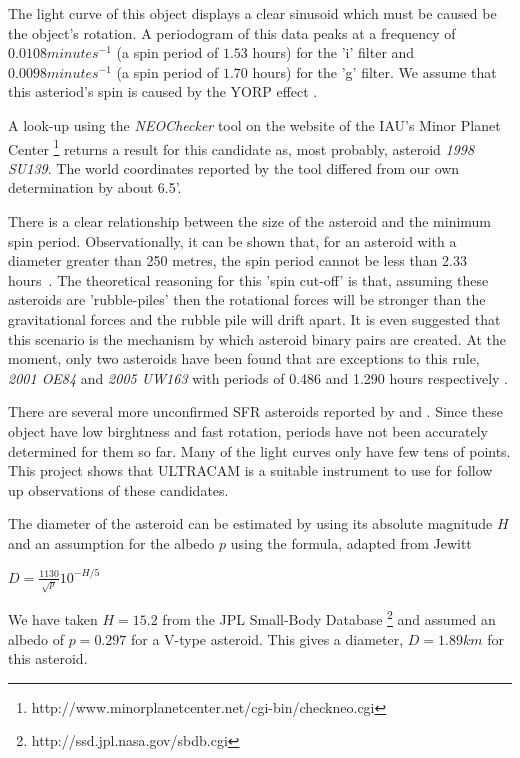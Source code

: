   The light curve of this object displays a clear sinusoid which must be caused be the object's rotation. A periodogram of this data peaks at a frequency of $0.0108 minutes^{-1}$ (a spin period of $1.53$ hours) for the 'i' filter and $0.0098 minutes^{-1}$ (a spin period of $1.70$ hours) for the 'g' filter. We assume that this asteriod's spin is caused by the YORP effect \cite{yorpeffect}. 

  A look-up using the \emph{NEOChecker} tool on the website of the IAU's Minor Planet Center \footnote{http://www.minorplanetcenter.net/cgi-bin/checkneo.cgi} returns a result for this candidate as, most probably, asteroid \emph{1998 SU139}. The world coordinates reported by the tool differed from our own determination by about 6.5'. 

  There is a clear relationship between the size of the asteroid and the minimum spin period. Observationally, it can be shown that, for an asteroid with a diameter greater than 250 metres, the spin period cannot be less than 2.33 hours~\cite{Jacobson2014}. The theoretical reasoning for this 'spin cut-off'  is that, assuming these asteroids are 'rubble-piles' then the rotational forces will be stronger than the gravitational forces and the rubble pile will drift apart. It is even suggested that this scenario is the mechanism by which asteroid binary pairs are created. At the moment, only two asteroids have been found that are exceptions to this rule, \emph{2001 OE84} and \emph{2005 UW163} with periods of 0.486 and 1.290 hours respectively \cite{Chang2014}. 

  There are several more unconfirmed SFR asteroids reported by \cite{Masiero2009} and \cite{Dermawan2011}. Since these object have low birghtness and fast rotation, periods have not been accurately determined for them so far. Many of the light curves only have few tens of points. This project shows that ULTRACAM is a suitable instrument to use for follow up observations of these candidates.  

  The diameter of the asteroid can be estimated by using its absolute magnitude $H$ and an assumption for the albedo $p$ using the formula, adapted from Jewitt \cite{Jewitt2013}

  $D = \frac{1130}{\sqrt{p}}10^{-H/5} $

  We have taken $H = 15.2$ from the JPL Small-Body Database \footnote{http://ssd.jpl.nasa.gov/sbdb.cgi} and assumed an albedo of $ p = 0.297$ for a V-type asteroid. This gives a diameter, $D = 1.89 km$ for this asteroid. 

